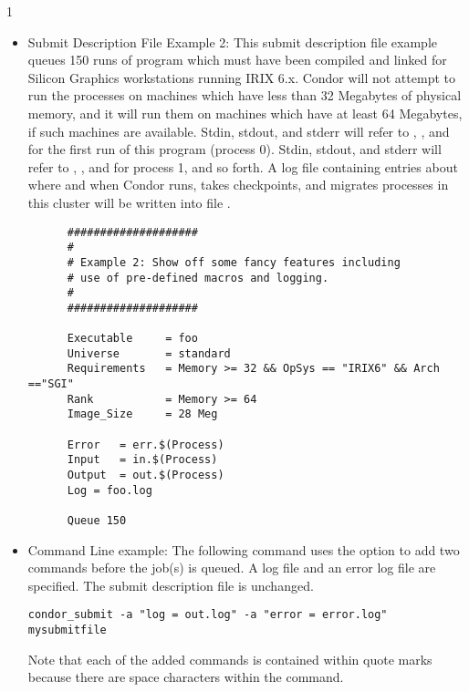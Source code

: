 \begin{ManPage}{\label{man-condor-submit}}{1}
\begin{itemize}
\item{Submit Description File Example 2:} This submit description file
example queues 150
runs of program  which must have been compiled and linked for
Silicon Graphics workstations running IRIX 6.x.
Condor will not attempt
to run the processes on machines which have less than 32 Megabytes of
physical memory, and it will run them on machines which have at least 64
Megabytes, if such machines are available.
Stdin, stdout, and stderr will
refer to , , and  for the first run
of this program (process 0).
Stdin, stdout, and stderr will refer to
, , and  for process 1, and so forth.
A log file containing entries
about where and when Condor runs, takes checkpoints, and migrates processes
in this cluster will be written into file .

\footnotesize
\begin{verbatim}
      ####################                                                    
      #                                                                       
      # Example 2: Show off some fancy features including
      # use of pre-defined macros and logging.                                
      #                                                                       
      ####################                                                    
                                                                          
      Executable     = foo                                                    
      Universe       = standard
      Requirements   = Memory >= 32 && OpSys == "IRIX6" && Arch =="SGI"     
      Rank           = Memory >= 64
      Image_Size     = 28 Meg                                                 
                                                                          
      Error   = err.$(Process)                                                
      Input   = in.$(Process)                                                 
      Output  = out.$(Process)                                                
      Log = foo.log                                                                       
                                                                          
      Queue 150
\end{verbatim}
\normalsize

\item{Command Line example:} The following command uses the
 option to add two commands before the job(s) is queued.
A log file and an error log file are specified.
The submit description file is unchanged.
\footnotesize
\begin{verbatim}
condor_submit -a "log = out.log" -a "error = error.log" mysubmitfile
\end{verbatim}
\normalsize
Note that each of the added commands is contained within quote marks
because there are space characters within the command.


\end{itemize}
\end{ManPage}
